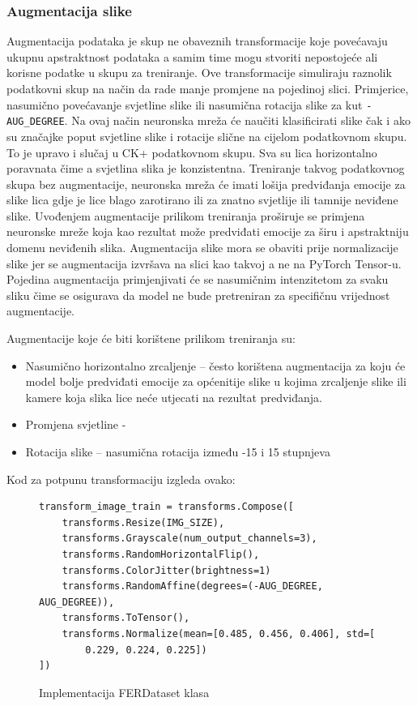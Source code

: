 \documentclass[times, utf8, zavrsni,numeric,pstricks]{fer}
\begin{document}
\subsubsection{Augmentacija slike}


Augmentacija podataka  je skup ne obaveznih transformacije koje povećavaju ukupnu apstraktnost podataka a samim time mogu stvoriti nepostojeće ali korisne podatke u skupu za treniranje. Ove transformacije simuliraju raznolik podatkovni skup na način da rade manje promjene na pojedinoj slici. Primjerice, nasumično povećavanje svjetline slike ili nasumična rotacija slike za kut \lstinline"-AUG_DEGREE". Na ovaj način neuronska mreža će naučiti klasificirati slike čak i ako su značajke poput svjetline slike i rotacije slične na cijelom podatkovnom skupu. To je upravo i slučaj u CK+ podatkovnom skupu. Sva su lica horizontalno poravnata čime a svjetlina slika je konzistentna.  Treniranje takvog podatkovnog skupa bez augmentacije, neuronska mreža će imati lošija predviđanja  emocije za slike lica gdje je lice blago zarotirano ili za znatno svjetlije ili tamnije neviđene slike. Uvođenjem augmentacije prilikom treniranja proširuje se primjena neuronske mreže koja kao rezultat može predviđati emocije za širu i apstraktniju domenu neviđenih slika. Augmentacija slike mora se obaviti prije normalizacije slike jer se augmentacija izvršava na slici kao takvoj a ne na PyTorch Tensor-u. Pojedina augmentacija primjenjivati će se nasumičnim intenzitetom za svaku sliku čime se osigurava da model ne bude pretreniran za specifičnu vrijednost augmentacije. 

 Augmentacije koje će biti korištene prilikom treniranja su:

\begin{itemize}
	\item{Nasumično horizontalno zrcaljenje} – često korištena augmentacija za koju će model bolje predviđati emocije za općenitije slike u kojima zrcaljenje slike ili kamere koja slika lice neće utjecati na rezultat predviđanja.
		
	\item{Promjena svjetline} - 
	
	\item{Rotacija slike} – nasumična rotacija između -15 i 15 stupnjeva
\end{itemize}



\noindent
Kod za potpunu transformaciju izgleda ovako:

\begin{figure}[H]
\centering
\begin{Verbatim}[fontsize=\small]
transform_image_train = transforms.Compose([
    transforms.Resize(IMG_SIZE),
    transforms.Grayscale(num_output_channels=3),
    transforms.RandomHorizontalFlip(),
    transforms.ColorJitter(brightness=1)
    transforms.RandomAffine(degrees=(-AUG_DEGREE, AUG_DEGREE)),
    transforms.ToTensor(),
    transforms.Normalize(mean=[0.485, 0.456, 0.406], std=[
        0.229, 0.224, 0.225])
])
\end{Verbatim}
\caption{Implementacija FERDataset klasa}
\label{pic:pytorch_transform_aug}
\end{figure}
\end{document}
